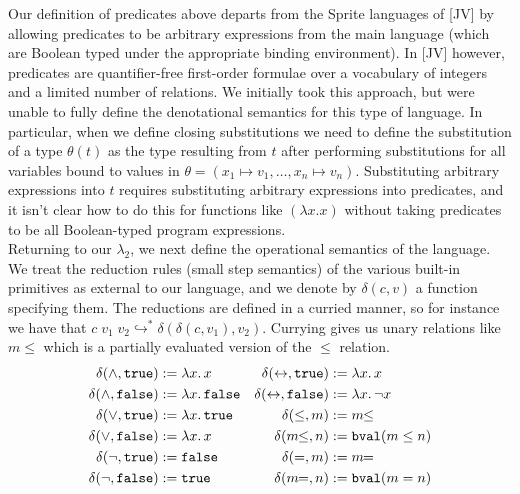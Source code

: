 \documentclass[11pt]{article}
\newcommand{\many}{\hookrightarrow^*}
\newcommand{\true}{\mathtt{true}}
\begin{document}
Our definition of predicates above departs from the Sprite languages of [JV] by allowing predicates to be arbitrary expressions from the main language (which are Boolean typed under the appropriate binding environment).
In [JV] however, predicates are quantifier-free first-order formulae over a vocabulary of integers and a limited number of relations. We initially took this approach, but were unable to fully define the denotational semantics for this type of language. In particular, when we define closing substitutions we need to define the substitution of a type $\theta(t)$ as the type resulting from $t$ after performing substitutions for all variables bound to values in
$\theta = (x_1 \mapsto v_1, \ldots, x_n \mapsto v_n)$. Substituting arbitrary expressions into $t$ requires substituting arbitrary expressions into predicates, and it isn't clear how to do this for functions like $(\lambda x. x)$ without taking predicates to be all Boolean-typed program expressions. \\

Returning to our $\lambda_2$, we next define the operational semantics of the language. We treat the reduction rules (small step semantics) of the various built-in primitives as external to our language, and we denote by $\delta(c,v)$ a function specifying them. The reductions are defined in a curried manner, so for instance we have that 
$c\; v_1\; v_2 \many \delta(\delta(c,v_1),v_2)$. Currying gives us unary relations like $m\!\!\leq$ which is a partially evaluated version of the $\leq$ relation.
\begin{align*}
\delta(\wedge,\true) &:= \lambda x.\, x &
  \delta(\leftrightarrow,\true) &:= \lambda x.\, x\\
\delta(\wedge,{\tt false}) &:= \lambda x.\, {\tt false} &
  \delta(\leftrightarrow,{\tt false}) &:= \lambda x.\, \neg x\\
\delta(\vee,\true) &:= \lambda x.\, \true &
  \delta(\leq,m) &:= m\!\!\leq  \\
\delta(\vee,{\tt false}) &:= \lambda x.\, x &
  \delta(m\!\!\leq, n) &:= {\tt bval}(m \leq n)\\ 
\delta(\neg,\true) &:= {\tt false} & 
  \delta(=,m) &:= m\!\!= \\
\delta(\neg,{\tt false}) &:= \true &
  \delta(m\!\!=, n) &:= {\tt bval}(m = n)
\end{align*}
\end{document}

